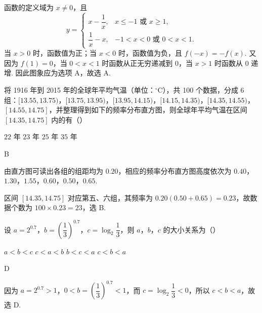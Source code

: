 \begin{solution}
函数的定义域为 \(x\ne0\)，且
\[
y=\begin{cases}
x-\dfrac{1}{x}, & x\le -1\text{ 或 }x\ge1,\\
\dfrac{1}{x}-x, & -1<x<0\text{ 或 }0<x<1.
\end{cases}
\]
当 \(x>0\) 时，函数值为正；当 \(x<0\) 时，函数值为负，且 \(f(-x)=-f(x)\). 又因为 \(f(1)=0\)，当 \(0<x<1\) 时函数从正无穷递减到 \(0\)，当 \(x>1\) 时函数从 \(0\) 递增. 因此图象应为选项 A，故选 A.
\end{solution}

\begin{problem}
将 1916 年到 2015 年的全球年平均气温（单位：\({}^{\circ}\mathrm C\)），共 100 个数据，分成 6 组：\([13.55,13.75)\)，\([13.75,13.95)\)，\([13.95,14.15)\)，\([14.15,14.35)\)，\([14.35,14.55)\)，\([14.55,14.75]\)，并整理得到如下的频率分布直方图，则全球年平均气温在区间 \([14.35,14.75]\) 内的有（\quad）


\choices
    {\(22\text{ 年}\)}
    {\(23\text{ 年}\)}
    {\(25\text{ 年}\)}
    {\(35\text{ 年}\)}
\end{problem}

\begin{answer}
B
\end{answer}

\begin{solution}
由直方图可读出各组的组距均为 \(0.20\)，相应的频率分布直方图高度依次为 \(0.40\)，\(1.30\)，\(1.55\)，\(0.60\)，\(0.50\)，\(0.65\).

区间 \([14.35,14.75]\) 对应第五、六组，其频率为
\(0.20(0.50+0.65)=0.23\)，故数据个数为 \(100\times0.23=23\)，选 B.
\end{solution}

\begin{problem}
设 \(a=2^{0.7}\)，\(b=\left(\dfrac{1}{3}\right)^{0.7}\)，\(c=\log_2\dfrac{1}{3}\)，则 \(a\)，\(b\)，\(c\) 的大小关系为（\quad）

\choices
    {\(a<b<c\)}
    {\(c<a<b\)}
    {\(b<c<a\)}
    {\(c<b<a\)}
\end{problem}

\begin{answer}
D
\end{answer}

\begin{solution}
因为 \(a=2^{0.7}>1\)，\(0<b=\left(\dfrac{1}{3}\right)^{0.7}<1\)，而 \(c=\log_2\dfrac{1}{3}<0\)，所以 \(c<b<a\)，故选 D.
\end{solution}

